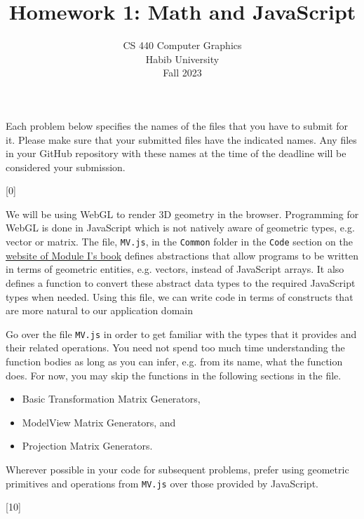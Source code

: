 \documentclass[addpoints]{exam}
\title{Homework 1: Math and JavaScript}
\author{CS 440 Computer Graphics\\Habib University\\Fall 2023}
\date{}
\begin{document}
\maketitle

Each problem below specifies the names of the files that you have to submit for it. Please make sure that your submitted files have the indicated names. Any files in your GitHub repository with these names at the time of the deadline will be considered your submission.

\begin{questions}

  [0]

  We will be using WebGL to render 3D geometry in the browser. Programming for WebGL is done in JavaScript which is not natively aware of geometric types, e.g. vector or matrix. The file, \texttt{MV.js}, in the \texttt{Common} folder in the \texttt{Code} section on the \href{https://www.cs.unm.edu/~angel/BOOK/INTERACTIVE_COMPUTER_GRAPHICS/SEVENTH_EDITION/}{website of Module I's book} defines abstractions that allow programs to be written in terms of geometric entities, e.g. vectors, instead of JavaScript arrays. It also defines a function to convert these abstract data types to the required JavaScript types when needed. Using this file, we can write code in terms of constructs that are more natural to our application domain

  Go over the file {\tt MV.js} in order to get familiar with the types that it provides and their related operations. You need not spend too much time understanding the function bodies as long as you can infer, e.g. from its name, what the function does. For now, you may skip the functions in the following sections in the file.
  \begin{itemize}
  \item Basic Transformation Matrix Generators, 
  \item ModelView Matrix Generators, and
  \item Projection Matrix Generators.
  \end{itemize}

  Wherever possible in your code for subsequent problems, prefer using geometric primitives and operations from {\tt MV.js} over those provided by JavaScript.
  
  [10]


\end{questions}
\end{document}
